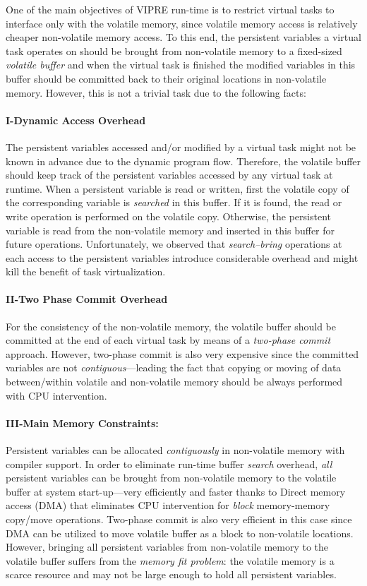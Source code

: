 One of the main objectives of VIPRE run-time is to restrict virtual tasks to interface only with the volatile memory, since volatile memory access is relatively cheaper non-volatile memory access. To this end, the persistent variables a virtual task operates on should be brought from non-volatile memory to a fixed-sized \emph{volatile buffer} and when the virtual task is finished the modified variables in this buffer should be committed back to their original locations in non-volatile memory. However, this is not a trivial task due to the following facts: 

\paragraph{I-Dynamic Access Overhead} The persistent variables accessed and/or modified by a virtual task might not be known in advance due to the dynamic program flow. Therefore, the  volatile buffer should keep track of the persistent variables accessed by any virtual task at runtime. When a persistent variable is read or written, first the volatile copy of the corresponding variable is \emph{searched} in this buffer. If it is found, the read or write operation is performed on the volatile copy. Otherwise, the persistent variable is read from the non-volatile memory and inserted in this buffer for future operations. Unfortunately, we observed that \emph{search--bring} operations at each access to the persistent variables introduce considerable overhead and might kill the benefit of task virtualization.
 
\paragraph{II-Two Phase Commit Overhead}  For the consistency of the non-volatile memory, the volatile buffer should be committed at the end of each virtual task by means of a \emph{two-phase commit} approach.  However, two-phase commit is also very expensive since the committed variables are not \emph{contiguous}---leading the fact that copying or moving of data between/within volatile and non-volatile memory should be always performed with CPU intervention. 

\paragraph{III-Main Memory Constraints:} Persistent variables can be allocated \emph{contiguously} in non-volatile memory with compiler support. In order to eliminate run-time buffer \emph{search} overhead, \emph{all} persistent variables can be brought from non-volatile memory to the volatile buffer at system start-up---very efficiently and faster thanks to Direct memory access (DMA) that eliminates CPU intervention for \emph{block} memory-memory copy/move operations. Two-phase commit is also very efficient in this case since DMA can be utilized to move volatile buffer as a block to non-volatile locations. However, bringing all persistent variables from non-volatile memory to the volatile buffer suffers from the \emph{memory fit problem}: the volatile memory is a scarce resource and may not be large enough to hold all persistent variables. 


